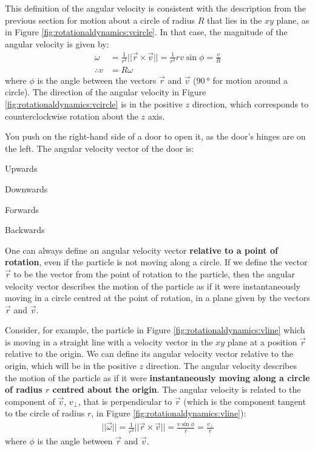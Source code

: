 This definition of the angular velocity is consistent with the description from the previous section for motion about a circle of radius $R$ that lies in the $xy$ plane, as in Figure \ref{fig:rotationaldynamics:vcircle}. In that case, the magnitude of the angular velocity is given by:
\begin{align*}
\omega &=\frac{1}{r^2} || \vec r \times \vec v||= \frac{1}{r^2}r v\sin\phi= \frac{v}{R}\\
\therefore v &= R\omega
\end{align*}
where $\phi$ is the angle between the vectors $\vec r$ and $\vec v$ ($\SI{90}{\degree}$ for motion around a circle). The direction of the angular velocity in Figure \ref{fig:rotationaldynamics:vcircle} is in the positive $z$ direction, which corresponds to counterclockwise rotation about the $z$ axis. 

\begin{checkpoint}
\begin{MCquestion}{You push on the right-hand side of a door to open it, as the door's hinges are on the left. The angular velocity vector of the door is:}
\item Upwards \correct
\item Downwards
\item Forwards
\item Backwards
\end{MCquestion}
\end{checkpoint}

One can always define an angular velocity vector \textbf{relative to a point of rotation}, even if the particle is not moving along a circle. If we define the vector $\vec r$ to be the vector from the point of rotation to the particle, then the angular velocity vector describes the motion of the particle as if it were instantaneously moving in a circle centred at the point of rotation, in a plane given by the vectors $\vec r$ and $\vec v$. 

Consider, for example, the particle in Figure \ref{fig:rotationaldynamics:vline} which is moving in a straight line with a velocity vector in the $xy$ plane at a position $\vec r$ relative to the origin. We can define its angular velocity vector relative to the origin, which will be in the positive $z$ direction. 
The angular velocity describes the motion of the particle as if it were \textbf{instantaneously moving along a circle of radius $r$ centred about the origin}. The angular velocity is related to the component of $\vec v$, $v_\perp$, that is perpendicular to $\vec r$ (which is the component tangent to the circle of radius $r$, in Figure \ref{fig:rotationaldynamics:vline}):
\begin{align}
||\vec \omega|| = \frac{1}{r^2} || \vec r \times \vec v||=\frac{v\sin\phi}{r}= \frac{v_\perp}{r}
\end{align}
where $\phi$ is the angle between $\vec r$ and $\vec v$.

